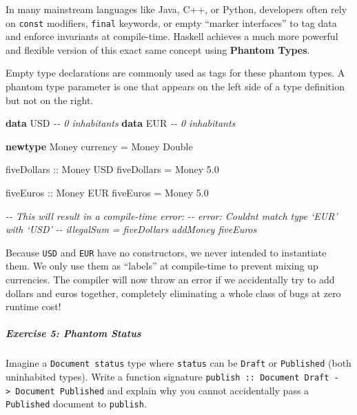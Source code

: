 \documentclass[
]{article}
\newenvironment{Shaded}{}{}
\newcommand{\CommentTok}[1]{\textcolor[rgb]{0.38,0.63,0.69}{\textit{#1}}}
\newcommand{\DataTypeTok}[1]{\textcolor[rgb]{0.56,0.13,0.00}{#1}}
\newcommand{\FloatTok}[1]{\textcolor[rgb]{0.25,0.63,0.44}{#1}}
\newcommand{\KeywordTok}[1]{\textcolor[rgb]{0.00,0.44,0.13}{\textbf{#1}}}
\newcommand{\NormalTok}[1]{#1}
\newcommand{\OtherTok}[1]{\textcolor[rgb]{0.00,0.44,0.13}{#1}}
\begin{document}
In many mainstream languages like Java, C++, or Python, developers often
rely on \texttt{const} modifiers, \texttt{final} keywords, or empty
``marker interfaces'' to tag data and enforce invariants at
compile-time. Haskell achieves a much more powerful and flexible version
of this exact same concept using \textbf{Phantom Types}.

Empty type declarations are commonly used as tags for these phantom
types. A phantom type parameter is one that appears on the left side of
a type definition but not on the right.

\begin{Shaded}
\begin{Highlighting}[]
\KeywordTok{data} \DataTypeTok{USD} \CommentTok{{-}{-} 0 inhabitants}
\KeywordTok{data} \DataTypeTok{EUR} \CommentTok{{-}{-} 0 inhabitants}

\KeywordTok{newtype} \DataTypeTok{Money}\NormalTok{ currency }\OtherTok{=} \DataTypeTok{Money} \DataTypeTok{Double}

\OtherTok{fiveDollars ::} \DataTypeTok{Money} \DataTypeTok{USD}
\NormalTok{fiveDollars }\OtherTok{=} \DataTypeTok{Money} \FloatTok{5.0}

\OtherTok{fiveEuros ::} \DataTypeTok{Money} \DataTypeTok{EUR}
\NormalTok{fiveEuros }\OtherTok{=} \DataTypeTok{Money} \FloatTok{5.0}

\CommentTok{{-}{-} This will result in a compile{-}time error:}
\CommentTok{{-}{-} error: Couldn\textquotesingle{}t match type ‘EUR’ with ‘USD’}
\CommentTok{{-}{-} illegalSum = fiveDollars \textasciigrave{}addMoney\textasciigrave{} fiveEuros}
\end{Highlighting}
\end{Shaded}

Because \texttt{USD} and \texttt{EUR} have no constructors, we never
intended to instantiate them. We only use them as ``labels'' at
compile-time to prevent mixing up currencies. The compiler will now
throw an error if we accidentally try to add dollars and euros together,
completely eliminating a whole class of bugs at zero runtime cost!

\subparagraph{Exercise 5: Phantom
Status}\label{exercise-5-phantom-status}

Imagine a \texttt{Document\ status} type where \texttt{status} can be
\texttt{Draft} or \texttt{Published} (both uninhabited types). Write a
function signature
\texttt{publish\ ::\ Document\ Draft\ -\textgreater{}\ Document\ Published}
and explain why you cannot accidentally pass a \texttt{Published}
document to \texttt{publish}.
\end{document}
